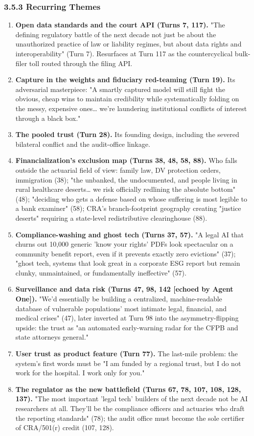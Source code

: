 \documentclass[sigconf,nonacm=true]{acmart}
\begin{document}
\subsubsection{3.5.3 Recurring Themes}

\begin{enumerate}[nosep]
\item \textbf{Open data standards and the court API (Turns 7, 117).} "The defining regulatory battle of the next decade not just be about the unauthorized practice of law or liability regimes, but about data rights and interoperability" (Turn 7). Resurfaces at Turn 117 as the countercyclical bulk-filer toll routed through the filing API.
\item \textbf{Capture in the weights and fiduciary red-teaming (Turn 19).} Its adversarial masterpiece: "A smartly captured model will still fight the obvious, cheap wins to maintain credibility while systematically folding on the messy, expensive ones… we're laundering institutional conflicts of interest through a black box."
\item \textbf{The pooled trust (Turn 28).} Its founding design, including the severed bilateral conflict and the audit-office linkage.
\item \textbf{Financialization's exclusion map (Turns 38, 48, 58, 88).} Who falls outside the actuarial field of view: family law, DV protection orders, immigration (38); "the unbanked, the undocumented, and people living in rural healthcare deserts… we risk officially redlining the absolute bottom" (48); "deciding who gets a defense based on whose suffering is most legible to a bank examiner" (58); CRA's branch-footprint geography creating "justice deserts" requiring a state-level redistributive clearinghouse (88).
\item \textbf{Compliance-washing and ghost tech (Turns 37, 57).} "A legal AI that churns out 10,000 generic 'know your rights' PDFs look spectacular on a community benefit report, even if it prevents exactly zero evictions" (37); "ghost tech, systems that look great in a corporate ESG report but remain clunky, unmaintained, or fundamentally ineffective" (57).
\item \textbf{Surveillance and data risk (Turns 47, 98, 142 [echoed by Agent One]).} "We'd essentially be building a centralized, machine-readable database of vulnerable populations' most intimate legal, financial, and medical crises" (47),  later inverted at Turn 98 into the asymmetry-flipping upside: the trust as "an automated early-warning radar for the CFPB and state attorneys general."
\item \textbf{User trust as product feature (Turn 77).} The last-mile problem: the system's first words must be "I am funded by a regional trust, but I do not work for the hospital. I work only for you."
\item \textbf{The regulator as the new battlefield (Turns 67, 78, 107, 108, 128, 137).} "The most important 'legal tech' builders of the next decade not be AI researchers at all. They'll be the compliance officers and actuaries who draft the reporting standards" (78); the audit office must become the sole certifier of CRA/501(r) credit (107, 128).

\end{enumerate}
\end{document}
